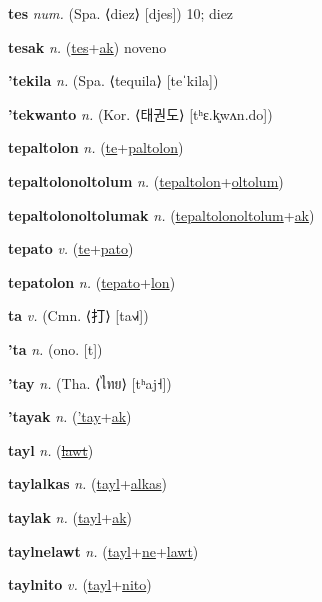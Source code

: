 \textbf{\hypertarget{tes}{tes}} \textit{num.} (Spa. ⟨diez⟩ [djes])
10; diez

\textbf{\hypertarget{tesak}{tesak}} \textit{n.} (\hyperlink{tes}{tes}+\allowbreak \hyperlink{ak}{ak})
noveno

\textbf{\hypertarget{'tekila}{'tekila}} \textit{n.} (Spa. ⟨tequila⟩ [teˈkila])


\textbf{\hypertarget{'tekwanto}{'tekwanto}} \textit{n.} (Kor. ⟨{\korean{}태권도}⟩ [tʰɛ.k͈wʌn.do])


\textbf{\hypertarget{tepaltolon}{tepaltolon}} \textit{n.} (\hyperlink{te}{te}+\allowbreak \hyperlink{paltolon}{paltolon})


\textbf{\hypertarget{tepaltolonoltolum}{tepaltolonoltolum}} \textit{n.} (\hyperlink{tepaltolon}{tepaltolon}+\allowbreak \hyperlink{oltolum}{oltolum})


\textbf{\hypertarget{tepaltolonoltolumak}{tepaltolonoltolumak}} \textit{n.} (\hyperlink{tepaltolonoltolum}{tepaltolonoltolum}+\allowbreak \hyperlink{ak}{ak})


\textbf{\hypertarget{tepato}{tepato}} \textit{v.} (\hyperlink{te}{te}+\allowbreak \hyperlink{pato}{pato})


\textbf{\hypertarget{tepatolon}{tepatolon}} \textit{n.} (\hyperlink{tepato}{tepato}+\allowbreak \hyperlink{lon}{lon})


\textbf{\hypertarget{ta}{ta}} \textit{v.} (Cmn. ⟨{\chinese{}打}⟩ [ta˧˩˧])


\textbf{\hypertarget{'ta}{'ta}} \textit{n.} (ono. [t])


\textbf{\hypertarget{'tay}{'tay}} \textit{n.} (Tha. ⟨{\thai{}ไทย}⟩ [tʰaj˧])


\textbf{\hypertarget{'tayak}{'tayak}} \textit{n.} (\hyperlink{'tay}{'tay}+\allowbreak \hyperlink{ak}{ak})


\textbf{\hypertarget{tayl}{tayl}} \textit{n.} (\hyperlink{lawt}{\sout{lawt}})


\textbf{\hypertarget{taylalkas}{taylalkas}} \textit{n.} (\hyperlink{tayl}{tayl}+\allowbreak \hyperlink{alkas}{alkas})


\textbf{\hypertarget{taylak}{taylak}} \textit{n.} (\hyperlink{tayl}{tayl}+\allowbreak \hyperlink{ak}{ak})


\textbf{\hypertarget{taylnelawt}{taylnelawt}} \textit{n.} (\hyperlink{tayl}{tayl}+\allowbreak \hyperlink{ne}{ne}+\allowbreak \hyperlink{lawt}{lawt})


\textbf{\hypertarget{taylnito}{taylnito}} \textit{v.} (\hyperlink{tayl}{tayl}+\allowbreak \hyperlink{nito}{nito})


